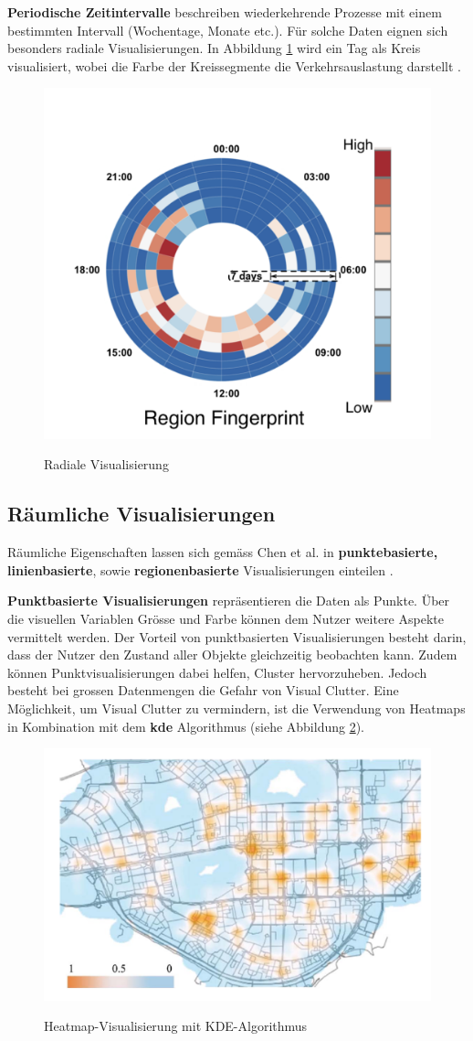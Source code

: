 \textbf{Periodische Zeitintervalle} beschreiben wiederkehrende Prozesse mit einem bestimmten Intervall (Wochentage, Monate etc.). Für solche Daten eignen sich besonders radiale Visualisierungen. In Abbildung \ref{fig_radial_layout} wird ein Tag als Kreis visualisiert, wobei die Farbe der Kreissegmente die Verkehrsauslastung darstellt \parencite[S. 2973 - 2974]{survey_traffic_data_visualization_2015}.

\begin{figure}[H]
    \caption{Radiale Visualisierung \parencite[S. 5]{radial_layout_t_watcher}}
    \includegraphics[width=.5\linewidth]{content/00_assets/radial_layout.png}
    \label{fig_radial_layout}
\end{figure}

\subsection{Räumliche Visualisierungen}
Räumliche Eigenschaften lassen sich gemäss Chen et al. in \textbf{punktebasierte, linienbasierte}, sowie \textbf{regionenbasierte} Visualisierungen einteilen \parencite[S. 2974 - 2975]{survey_traffic_data_visualization_2015}.

\textbf{Punktbasierte Visualisierungen} repräsentieren die Daten als Punkte. Über die visuellen Variablen Grösse und Farbe können dem Nutzer weitere Aspekte vermittelt werden. Der Vorteil von punktbasierten Visualisierungen besteht darin, dass der Nutzer den Zustand aller Objekte gleichzeitig beobachten kann. Zudem können Punktvisualisierungen dabei helfen, Cluster hervorzuheben. Jedoch besteht bei grossen Datenmengen die Gefahr von Visual Clutter. Eine Möglichkeit, um Visual Clutter zu vermindern, ist die Verwendung von Heatmaps in Kombination mit dem \textbf{\acrfull{kde}} Algorithmus (siehe Abbildung \ref{fig_heatmap_kde}).

\begin{figure}[H]
    \caption{Heatmap-Visualisierung mit KDE-Algorithmus \parencite{vait_system}}
    \includegraphics[width=.5\linewidth]{content/00_assets/heatmap_kde.png}
    \label{fig_heatmap_kde}
\end{figure}

